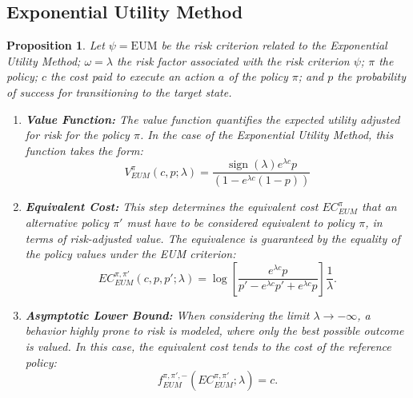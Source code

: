 \documentclass[runningheads]{llncs}
\DeclareMathOperator{\sign}{sign}
\newtheorem{proposition}{Proposition}
\begin{document}
\subsection{Exponential Utility Method}

\begin{proposition}
    Let $\psi = \text{EUM}$ be the risk criterion related to the Exponential Utility Method; $\omega = \lambda$ the risk factor associated with the risk criterion $\psi$; $\pi$ the policy; $c$ the cost paid to execute an action $a$ of the policy $\pi$; and $p$ the probability of success for transitioning to the target state.
    \begin{enumerate}
        \item \textbf{Value Function:} The value function quantifies the expected utility adjusted for risk for the policy $\pi$. In the case of the Exponential Utility Method, this function takes the form:
        \begin{equation}
            V^{\pi}_{EUM}(c, p; \lambda) = \frac 
            {\sign(\lambda) e^{\lambda c} p}
            {(1 - e^{\lambda c}(1 - p))}
        \end{equation}

        \item \textbf{Equivalent Cost:} This step determines the equivalent cost $EC^{\pi}_{EUM}$ that an alternative policy $\pi'$ must have to be considered equivalent to policy $\pi$, in terms of risk-adjusted value. The equivalence is guaranteed by the equality of the policy values under the EUM criterion:
        \begin{equation}
            EC^{\pi, \pi'}_{EUM}(c, p, p'; \lambda) = \log \left[ 
            \frac
                {e^{\lambda c} p}
                {p' - e^{\lambda c} p' + e^{\lambda c}p}
            \right] 
            \frac{1}{\lambda}.
        \end{equation}

        \item \textbf{Asymptotic Lower Bound:} When considering the limit $\lambda \to -\infty$, a behavior highly prone to risk is modeled, where only the best possible outcome is valued. In this case, the equivalent cost tends to the cost of the reference policy:
        \begin{equation}
            f^{\pi, \pi', -}_{EUM}(EC^{\pi, \pi'}_{EUM}; \lambda) = c.
        \end{equation}


\end{enumerate}
\end{proposition}
\end{document}
